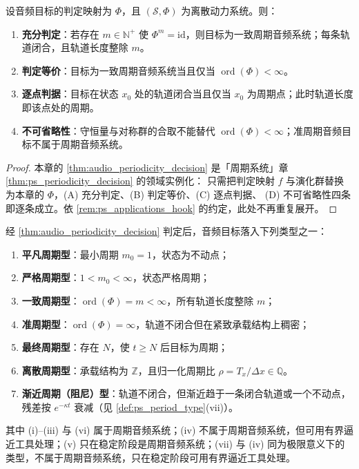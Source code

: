 \begin{theorem}[音频周期性判定定理]\label{thm:audio_periodicity_decision}
设音频目标的判定映射为 $\Phi$，且 $(\mathcal S,\Phi)$ 为离散动力系统。则：
\begin{enumerate}[label=(\Alph*)]
    \item \textbf{充分判定}：若存在 $m\in\mathbb N^+$ 使 $\Phi^m=\mathrm{id}$，则目标为一致周期音频系统；每条轨道闭合，且轨道长度整除 $m$。
    \item \textbf{判定等价}：目标为一致周期音频系统当且仅当 $\operatorname{ord}(\Phi)<\infty$。
    \item \textbf{逐点判据}：目标在状态 $x_0$ 处的轨道闭合当且仅当 $x_0$ 为周期点；此时轨道长度即该点处的周期。
    \item \textbf{不可省略性}：守恒量与对称群的合取不能替代 $\operatorname{ord}(\Phi)<\infty$；准周期音频目标不属于周期音频系统。
\end{enumerate}
\end{theorem}

\begin{proof}
本章的 \cref{thm:audio_periodicity_decision} 是「周期系统」章 \cref{thm:ps_periodicity_decision} 的领域实例化：
只需把判定映射 $f$ 与演化群替换为本章的 $\Phi$，(A) 充分判定、(B) 判定等价、(C) 逐点判据、
(D) 不可省略性四条即逐条成立。依 \cref{rem:ps_applications_hook} 的约定，此处不再重复展开。
\end{proof}

\begin{corollary}[音频周期类型]\label{cor:audio_period_type}
经 \cref{thm:audio_periodicity_decision} 判定后，音频目标落入下列类型之一：
\begin{enumerate}[label=(\roman*)]
    \item \textbf{平凡周期型}：最小周期 $m_0=1$，状态为不动点；
    \item \textbf{严格周期型}：$1<m_0<\infty$，状态严格周期；
    \item \textbf{一致周期型}：$\operatorname{ord}(\Phi)=m<\infty$，所有轨道长度整除 $m$；
    \item \textbf{准周期型}：$\operatorname{ord}(\Phi)=\infty$，轨道不闭合但在紧致承载结构上稠密；
    \item \textbf{最终周期型}：存在 $N$，使 $t\ge N$ 后目标为周期；
    \item \textbf{离散周期型}：承载结构为 $\mathbb Z$，且归一化周期比 $\rho=T_x/\Delta x\in\mathbb Q$。
    \item \textbf{渐近周期（阻尼）型}：轨道不闭合，但渐近趋于一条闭合轨道或一个不动点，残差按 $e^{-\kappa t}$ 衰减（见 \cref{def:ps_period_type}(vii)）。
\end{enumerate}
其中 (i)--(iii) 与 (vi) 属于周期音频系统；(iv) 不属于周期音频系统，但可用有界逼近工具处理；(v) 只在稳定阶段是周期音频系统；(vii) 与 (iv) 同为极限意义下的类型，不属于周期音频系统，只在稳定阶段可用有界逼近工具处理。
\end{corollary}


